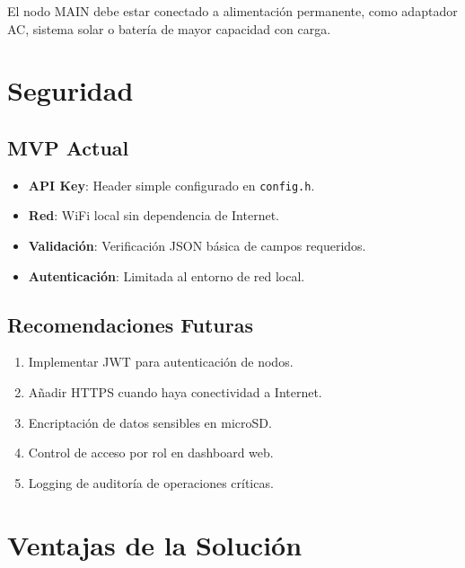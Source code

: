 \documentclass[journal]{IEEEtran}
\begin{document}
El nodo MAIN debe estar conectado a alimentación permanente, como adaptador AC, sistema solar o batería de mayor capacidad con carga.

\section{Seguridad}

\subsection{MVP Actual}

\begin{itemize}
\item \textbf{API Key}: Header simple configurado en \texttt{config.h}.
\item \textbf{Red}: WiFi local sin dependencia de Internet.
\item \textbf{Validación}: Verificación JSON básica de campos requeridos.
\item \textbf{Autenticación}: Limitada al entorno de red local.
\end{itemize}

\subsection{Recomendaciones Futuras}

\begin{enumerate}
\item Implementar JWT para autenticación de nodos.
\item Añadir HTTPS cuando haya conectividad a Internet.
\item Encriptación de datos sensibles en microSD.
\item Control de acceso por rol en dashboard web.
\item Logging de auditoría de operaciones críticas.
\end{enumerate}

\section{Ventajas de la Solución}
\end{document}
